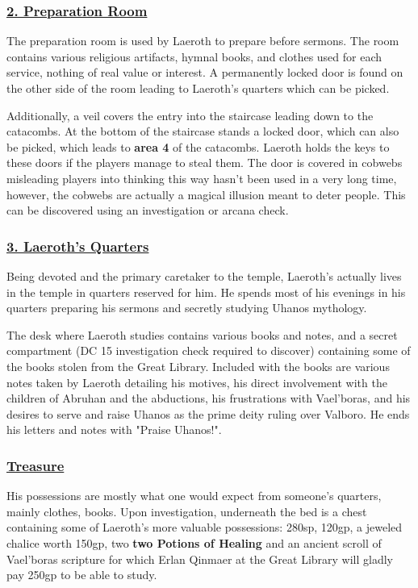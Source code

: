 \begin{multicols*}{2}
\subsubsection*{\underline{2. Preparation Room}}
The preparation room is used by Laeroth to prepare before sermons. The room contains various religious artifacts, hymnal books, and clothes used for each service, nothing of real value or interest. A permanently locked door is found on the other side of the room leading to Laeroth's quarters which can be picked. 

Additionally, a veil covers the entry into the staircase leading down to the catacombs. At the bottom of the staircase stands a locked door, which can also be picked, which leads to \textbf{area 4} of the catacombs. Laeroth holds the keys to these doors if the players manage to steal them. The door is covered in cobwebs misleading players into thinking this way hasn't been used in a very long time, however, the cobwebs are actually a magical illusion meant to deter people. This can be discovered using an investigation or arcana check. 

\subsubsection*{\underline{3. Laeroth's Quarters}}
Being devoted and the primary caretaker to the temple, Laeroth's actually lives in the temple in quarters reserved for him. He spends most of his evenings in his quarters preparing his sermons and secretly studying Uhanos mythology.
 
The desk where Laeroth studies contains various books and notes, and a secret compartment (DC 15 investigation check required to discover) containing some of the books stolen from the Great Library. Included with the books are various notes taken by Laeroth detailing his motives, his direct involvement with the children of Abruhan and the abductions, his frustrations with Vael'boras, and his desires to serve and raise Uhanos as the prime deity ruling over Valboro. He ends his letters and notes with "Praise Uhanos!".

\subsubsection*{\underline{\textbf{Treasure}}}
His possessions are mostly what one would expect from someone's quarters, mainly clothes, books. Upon investigation, underneath the bed is a chest containing some of Laeroth's more valuable possessions: 280sp, 120gp, a jeweled chalice worth 150gp, two \textbf{two Potions of Healing} and an ancient scroll of Vael'boras scripture for which Erlan Qinmaer at the Great Library will gladly pay 250gp to be able to study.


\end{multicols*}
